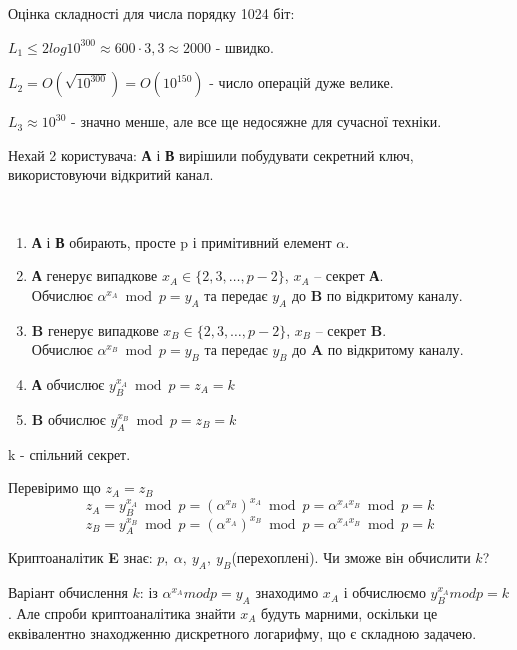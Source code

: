 \begin{example}Оцінка складності для числа порядку 1024 біт:

$L_1  \leq 2log10^{300}\approx 600 \cdot 3,3 \approx 2000$ - швидко.

$L_2 = O(\sqrt{10^{300}}) = O(10^{150})$ - число операцій дуже велике.

$L_3 \approx 10^{30}$ - значно менше, але все ще недосяжне для сучасної техніки.
\end{example}

Нехай 2 користувача: \textbf{А} і \textbf{В} вирішили побудувати секретний ключ, використовуючи відкритий канал.

\begin{algorithm}\

\begin{enumerate}

\item \textbf{А} і \textbf{В} обирають, просте p і примітивний елемент $\alpha$.

\item \textbf{А} генерує випадкове $x_A \in \{2,3, \dots, p-2\}$, $x_A$  – секрет \textbf{А}.\\
Обчислює $\alpha ^{x_A} \bmod p = y_A$ та передає $y_A$ до \textbf{B} по відкритому каналу.

\item \textbf{B} генерує випадкове $x_B \in \{2,3, \dots, p-2\}$, $x_B$  – секрет \textbf{B}.\\
Обчислює $\alpha ^{x_B} \bmod p = y_B$ та передає $y_B$ до \textbf{A} по відкритому каналу.

\item \textbf{А} обчислює $y_B^{x_A} \bmod p = z_A = k$

\item \textbf{B} обчислює $y_A^{x_B} \bmod p = z_B = k$
\end{enumerate}
k - спільний секрет.

\end{algorithm}
Перевіримо що $z_A=z_B$
\[ z_A = y_B^{x_A} \bmod p = (\alpha ^{x_B})^{x_A} \bmod p = \alpha ^{x_Ax_B} \bmod p = k \]
\[ z_B = y_A^{x_B} \bmod p = (\alpha ^{x_A})^{x_B} \bmod p = \alpha ^{x_Ax_B} \bmod p = k \]

Криптоаналітик \textbf{E} знає: $p,\ \alpha,\ y_A,\ y_B$(перехоплені). Чи зможе він обчислити $k$?

Варіант обчислення $k$: із $\alpha ^{x_A} mod p = y_A $ знаходимо $x_A$ і обчислюємо $y_B^{x_A} mod p = k$.
Але спроби криптоаналітика знайти $x_A$ будуть марними, оскільки це еквівалентно знаходженню дискретного логарифму, що є складною задачею.

